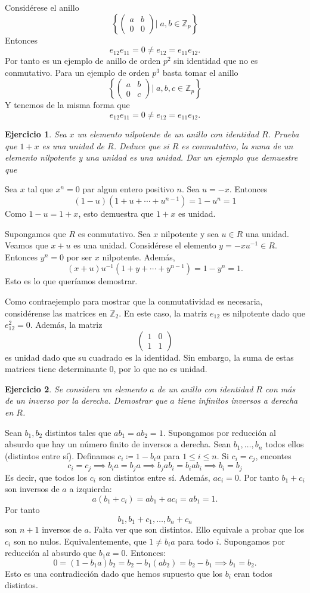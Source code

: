 \documentclass[11pt]{book}
\def\Z{\mathbb{Z}}
\newtheorem{ej}{Ejercicio}
\theoremstyle{definition}
\begin{document}
Considérese el anillo\[
\left\{
    \begin{pmatrix}
        a&b\\0&0
    \end{pmatrix}\Big|\; a,b\in \Z_p
\right\}
\]Entonces\[
e_{12}e_{11}=0\neq e_{12}=e_{11}e_{12}.
\]Por tanto es un ejemplo de anillo de orden $p^2$ sin identidad que no es conmutativo. Para un ejemplo de orden $p^3$ basta tomar el anillo\[
    \left\{
        \begin{pmatrix}
            a&b\\0&c
        \end{pmatrix}\Big|\; a,b,c\in \Z_p
    \right\}
\]Y tenemos de la misma forma que \[
    e_{12}e_{11}=0\neq e_{12}=e_{11}e_{12}.
\]
\begin{ej}
    Sea $x$ un elemento nilpotente de un anillo con identidad $R$. Prueba que $1+x$ es una unidad de $R$. Deduce que si $R$ es conmutativo, la suma de un elemento nilpotente y una unidad es una unidad. Dar un ejemplo que demuestre que 
\end{ej}
Sea $x$ tal que $x^n=0$ par algun entero positivo $n$. Sea $u=-x$. Entonces\[
(1-u)(1+u+\cdots + u^{n-1})=1-u^n=1
\]Como $1-u=1+x$, esto demuestra que $1+x$ es unidad.

Supongamos que $R$ es conmutativo. Sea $x$ nilpotente y sea $u\in R$ una unidad. Veamos que $x+u$ es una unidad. Considérese el elemento $y=-xu^{-1}\in R$. Entonces $y^n=0$ por ser $x$ nilpotente. Además,\[
(x+u)u^{-1}(1+y+\cdots + y^{n-1})=1-y^n=1.
\]Esto es lo que queríamos demostrar.

Como contraejemplo para mostrar que la conmutatividad es necesaria, considérense las matrices en $\Z_2$. En este caso, la matriz $e_{12}$ es nilpotente dado que $e_{12}^2=0$. Además, la matriz\[
\begin{pmatrix}
    1&0\\1&1
\end{pmatrix}
\]es unidad dado que su cuadrado es la identidad. Sin embargo, la suma de estas matrices tiene determinante 0, por lo que no es unidad.

\begin{ej}
    Se considera un elemento $a$ de un anillo con identidad $R$ con más de un inverso por la derecha. Demostrar que $a$ tiene infinitos inversos a derecha en $R$.
\end{ej}
\noindent Sean $b_1,b_2$ distintos tales que $ab_1=ab_2=1$. Supongamos por reducción al absurdo que hay un número finito de inversos a derecha. Sean $b_1,\dots,b_n$ todos ellos (distintos entre sí). Definamos $c_i\coloneq 1-b_ia$ para $1\leq i\leq n$. Si $c_i=c_j$, encontes\[
c_i=c_j\implies b_ia=b_ja\implies b_jab_i=b_iab_i\implies b_i=b_j
\]Es decir, que todos los $c_i$ son distintos entre sí. Además, $ac_i=0$. Por tanto $b_1+c_i$ son inversos de $a$ a izquierda:\[
a(b_1+c_i)=ab_1+ac_i=ab_1=1.
\]Por tanto\[
b_1,b_1+c_1,\dots,b_n+c_n
\]son $n+1$ inversos de $a$. Falta ver que son distintos. Ello equivale a probar que los $c_i$ son no nulos. Equivalentemente, que $1\neq b_ia$ para todo $i$. Supongamos por reducción al absurdo que $b_1a=0$. Entonces:\[
0=(1-b_1a)b_2=b_2-b_1(ab_2)=b_2-b_1\implies b_1=b_2.
\]Esto es una contradicción dado que hemos supuesto que los $b_i$ eran todos distintos.
\end{document}
